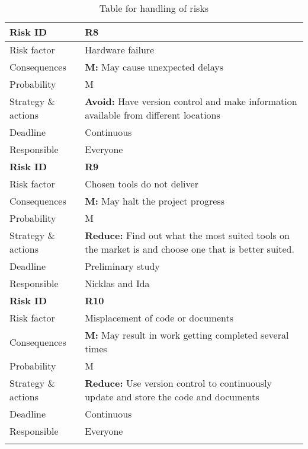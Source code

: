 \begin{longtable}{>{\setlength\hsize{.3\hsize}}X|>{\setlength\hsize{0.7\hsize}}X}
\textbf{Risk ID} & \textbf{R8} \\ \hline \hline
Risk factor & Hardware failure \\
Consequences & \textbf{M:} May cause unexpected delays \\
Probability & M \\
Strategy \& actions & \textbf{Avoid:} Have version control and make information available from different locations \\
Deadline & Continuous \\
Responsible & Everyone \\ \hline

\textbf{Risk ID} & \textbf{R9} \\ \hline \hline
Risk factor & Chosen tools do not deliver \\
Consequences & \textbf{M:} May halt the project progress \\
Probability & M \\
Strategy \& actions & \textbf{Reduce:} Find out what the most suited tools on the market is and choose one that is better suited. \\
Deadline & Preliminary study \\
Responsible & Nicklas  and Ida\\ \hline

\textbf{Risk ID} & \textbf{R10} \\ \hline \hline
Risk factor &  Misplacement of code or documents \\
Consequences & \textbf{M:} May result in work getting completed several times\\
Probability & M \\
Strategy \& actions & \textbf{Reduce:} Use version control to continuously update and store the code and documents \\
Deadline & Continuous \\
Responsible & Everyone \\ \hline
\hline
\caption{Table for handling of risks} \label{tab:risks}
\end{longtable}